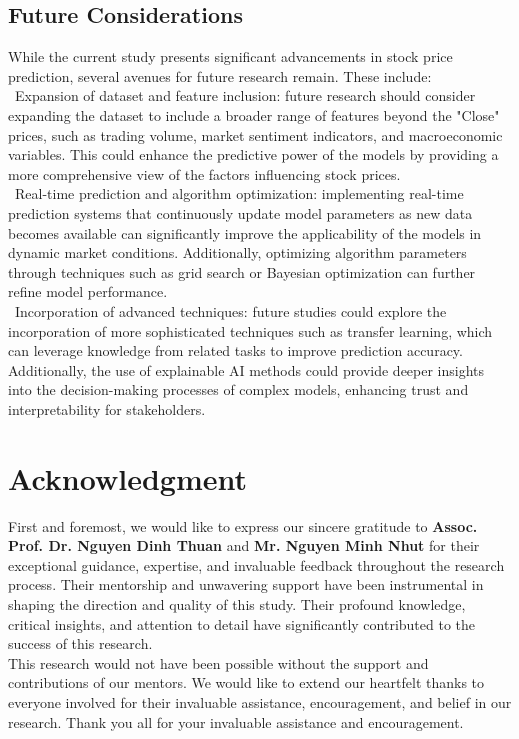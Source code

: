\documentclass{ieeeojies}
\begin{document}
\subsection{Future Considerations}
While the current study presents significant advancements in stock price prediction, several avenues for future research remain. These include:\\
\indent\textbullet\ Expansion of dataset and feature inclusion: future research should consider expanding the dataset to include a broader range of features beyond the "Close" prices, such as trading volume, market sentiment indicators, and macroeconomic variables. This could enhance the predictive power of the models by providing a more comprehensive view of the factors influencing stock prices. \\
\indent\textbullet\ Real-time prediction and algorithm optimization: implementing real-time prediction systems that continuously update model parameters as new data becomes available can significantly improve the applicability of the models in dynamic market conditions. Additionally, optimizing algorithm parameters through techniques such as grid search or Bayesian optimization can further refine model performance. \\
\indent\textbullet\ Incorporation of advanced techniques: future studies could explore the incorporation of more sophisticated techniques such as transfer learning, which can leverage knowledge from related tasks to improve prediction accuracy. Additionally, the use of explainable AI methods could provide deeper insights into the decision-making processes of complex models, enhancing trust and interpretability for stakeholders.

\section*{Acknowledgment}
First and foremost, we would like to express our sincere gratitude to \textbf{Assoc. Prof. Dr. Nguyen Dinh Thuan} and \textbf{Mr. Nguyen Minh Nhut} for their exceptional guidance, expertise, and invaluable feedback throughout the research process. Their mentorship and unwavering support have been instrumental in shaping the direction and quality of this study. Their profound knowledge, critical insights, and attention to detail have significantly contributed to the success of this research.
\\This research would not have been possible without the support and contributions of our mentors. We would like to extend our heartfelt thanks to everyone involved for their invaluable assistance, encouragement, and belief in our research. Thank you all for your invaluable assistance and encouragement.
\end{document}
